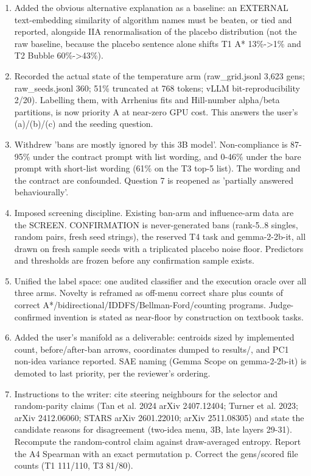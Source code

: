 \documentclass[11pt,letterpaper]{article}
\begin{document}
\begin{enumerate}
\item Added the obvious alternative explanation as a baseline: an EXTERNAL text-embedding similarity of algorithm names must be beaten, or tied and reported, alongside IIA renormalisation of the placebo distribution (not the raw baseline, because the placebo sentence alone shifts T1 A* 13\%-\textgreater{}1\% and T2 Bubble 60\%-\textgreater{}43\%).

\item Recorded the actual state of the temperature arm (raw\_grid.jsonl 3,623 gens; raw\_seeds.jsonl 360; 51\% truncated at 768 tokens; vLLM bit-reproducibility 2/20). Labelling them, with Arrhenius fits and Hill-number alpha/beta partitions, is now priority A at near-zero GPU cost. This answers the user's (a)/(b)/(c) and the seeding question.

\item Withdrew 'bans are mostly ignored by this 3B model'. Non-compliance is 87-95\% under the contract prompt with list wording, and 0-46\% under the bare prompt with short-list wording (61\% on the T3 top-5 list). The wording and the contract are confounded. Question 7 is reopened as 'partially answered behaviourally'.

\item Imposed screening discipline. Existing ban-arm and influence-arm data are the SCREEN. CONFIRMATION is never-generated bans (rank-5..8 singles, random pairs, fresh seed strings), the reserved T4 task and gemma-2-2b-it, all drawn on fresh sample seeds with a triplicated placebo noise floor. Predictors and thresholds are frozen before any confirmation sample exists.

\item Unified the label space: one audited classifier and the execution oracle over all three arms. Novelty is reframed as off-menu correct share plus counts of correct A*/bidirectional/IDDFS/Bellman-Ford/counting programs. Judge-confirmed invention is stated as near-floor by construction on textbook tasks.

\item Added the user's manifold as a deliverable: centroids sized by implemented count, before/after-ban arrows, coordinates dumped to results/, and PC1 non-idea variance reported. SAE naming (Gemma Scope on gemma-2-2b-it) is demoted to last priority, per the reviewer's ordering.

\item Instructions to the writer: cite steering neighbours for the selector and random-parity claims (Tan et al. 2024 arXiv 2407.12404; Turner et al. 2023; arXiv 2412.06060; STARS arXiv 2601.22010; arXiv 2511.08305) and state the candidate reasons for disagreement (two-idea menu, 3B, late layers 29-31). Recompute the random-control claim against draw-averaged entropy. Report the A4 Spearman with an exact permutation p. Correct the gens/scored file counts (T1 111/110, T3 81/80).

\end{enumerate}
\end{document}
